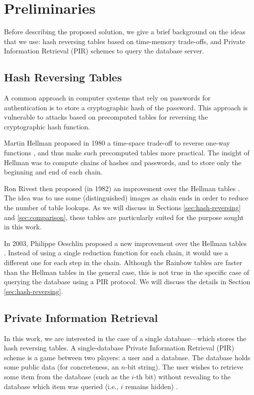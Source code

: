 \documentclass{llncs}
\newcommand{\ie}{i.e.}
\begin{document}
\section{Preliminaries} \label{sec:preliminaries}

Before describing the proposed solution, we give
a brief background on the ideas that we use: 
hash reversing tables based on time-memory trade-offs,
and Private Information Retrieval (PIR) schemes
to query the database server.



\subsection{Hash Reversing Tables}\label{sec:intro-hrt}

A common approach in computer systems that rely on passwords for authentication
is to store a cryptographic hash of the password. 
This approach is vulnerable to attacks based on precomputed tables for reversing 
the cryptographic hash function.

Martin Hellman proposed in 1980 a time-space
trade-off to reverse one-way functions \cite{paper:h-80}, 
and thus make such precomputed tables more practical.
The insight of Hellman was to compute chains
of hashes and passwords, and to store only the beginning
and end of each chain.

Ron Rivest then proposed (in 1982) an improvement over
the Hellman tables \cite{inbook:r-82}. The idea was
to use some (distinguished) images as chain ends in order to reduce the
number of table lookups.
As we will discuss in Sections \ref{sec:hash-reversing} and \ref{sec:comparison},
these tables are particularly suited for the purpose sought in this work.

In 2003, Philippe Oeschlin proposed a new improvement over the Hellman
tables \cite{paper:o-03}. Instead of using a single reduction function
for each chain, it would use a different one for each step in the
chain. Although the Rainbow tables are faster than the Hellman tables
in the general case, this is not true in the specific case of querying the database
using a PIR protocol.
We will discuss the details in Section \ref{sec:hash-reversing}.


\subsection{Private Information Retrieval} \label{sec:PIR}

In this work, we are interested in the case of a single database---which
stores the hash reversing tables.
A single-database Private Information Retrieval (PIR) scheme is a
game between two players: a user and a database. The database holds
some public data (for concreteness, an $n$-bit string). The user
wishes to retrieve some item from the database (such as the $i$-th
bit) without revealing to the database which item was queried (\ie,
$i$ remains hidden) \cite{paper:pir_survey}.
\end{document}
